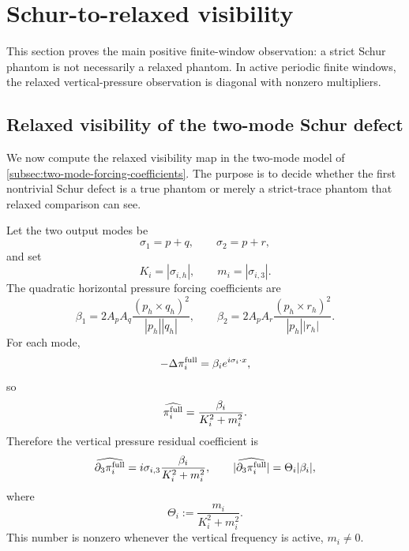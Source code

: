 \documentclass[11pt]{article}
\numberwithin{equation}{section}
\begin{document}
\section{Schur-to-relaxed visibility}

This section proves the main positive finite-window observation: a strict Schur phantom is not necessarily a relaxed phantom. In active periodic finite windows, the relaxed vertical-pressure observation is diagonal with nonzero multipliers.

\subsection{Relaxed visibility of the two-mode Schur defect}\label{subsec:two-mode-relaxed-visibility}

We now compute the relaxed visibility map in the two-mode model of \cref{subsec:two-mode-forcing-coefficients}.  The purpose is to decide whether the first nontrivial Schur defect is a true phantom or merely a strict-trace phantom that relaxed comparison can see.

Let the two output modes be
\[
        \sigma_1=p+q,
        \qquad
        \sigma_2=p+r,
\]
and set
\[
        K_i=|\sigma_{i,h}|,
        \qquad
        m_i=|\sigma_{i,3}|.
\]
The quadratic horizontal pressure forcing coefficients are
\begin{equation}\label{eq:beta1-beta2-rel}
        \beta_1
        =2A_pA_q\frac{(p_h\times q_h)^2}{|p_h||q_h|},
        \qquad
        \beta_2
        =2A_pA_r\frac{(p_h\times r_h)^2}{|p_h||r_h|}.
\end{equation}
For each mode,
\[
        -\Delta\pi_i^{\rm full}=\beta_i e^{i\sigma_i\cdot x},
\]
so
\[
        \widehat{\pi_i^{\rm full}}
        =\frac{\beta_i}{K_i^2+m_i^2}.
\]
Therefore the vertical pressure residual coefficient is
\begin{equation}\label{eq:Theta-beta}
        \widehat{\partial_3\pi_i^{\rm full}}
        =i\sigma_{i,3}\frac{\beta_i}{K_i^2+m_i^2},
        \qquad
        |\widehat{\partial_3\pi_i^{\rm full}}|
        =\Theta_i|\beta_i|,
\end{equation}
where
\begin{equation}\label{eq:Theta-def}
        \Theta_i:=\frac{m_i}{K_i^2+m_i^2}.
\end{equation}
This number is nonzero whenever the vertical frequency is active, \(m_i\ne0\).
\end{document}
